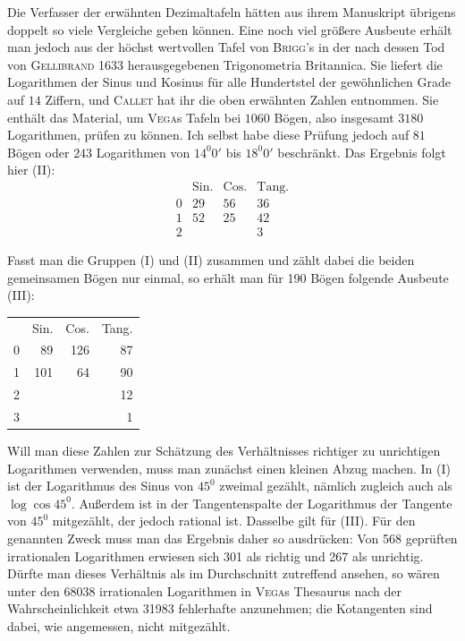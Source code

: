 Die Verfasser der erwähnten Dezimaltafeln hätten aus ihrem Manuskript übrigens doppelt so viele Vergleiche geben können. Eine noch viel größere Ausbeute erhält man jedoch aus der höchst wertvollen Tafel von \textsc{Brigg}'s in der nach dessen Tod von \textsc{Gellibrand} 1633 herausgegebenen Trigonometria Britannica. Sie liefert die Logarithmen der Sinus und Kosinus für alle Hundertstel der gewöhnlichen Grade auf \(14\) Ziffern, und \textsc{Callet} hat ihr die oben erwähnten Zahlen entnommen. Sie enthält das Material, um \textsc{Vega}s Tafeln bei \(1060\) Bögen, also insgesamt \(3180\) Logarithmen, prüfen zu können. Ich selbst habe diese Prüfung jedoch auf \(81\) Bögen oder \(243\) Logarithmen von \(14^{0}0'\) bis \(18^{0}0'\) beschränkt. Das Ergebnis folgt hier (II):
\[
\begin{array}{rccc}
 & \mathrm{Sin.} & \mathrm{Cos.} & \mathrm{Tang.} \\
0 & 29 & 56 & 36 \\
1 & 52 & 25 & 42 \\
2 &    &    & 3
\end{array}
\]
\par
{}
Fasst man die Gruppen (I) und (II) zusammen und zählt dabei die beiden gemeinsamen Bögen nur einmal, so erhält man für 190 Bögen folgende Ausbeute (III):
\begin{center}
\begin{tabular}{rrrr}
 & Sin. & Cos. & Tang. \\
0 & 89 & 126 & 87 \\
1 & 101 & 64 & 90 \\
2 & & & 12 \\
3 & & & 1
\end{tabular}
\end{center}
Will man diese Zahlen zur Schätzung des Verhältnisses richtiger zu unrichtigen Logarithmen verwenden, muss man zunächst einen kleinen Abzug machen. In (I) ist der Logarithmus des Sinus von $45^{0}$ zweimal gezählt, nämlich zugleich auch als $\log\cos45^{0}$. Außerdem ist in der Tangentenspalte der Logarithmus der Tangente von $45^{0}$ mitgezählt, der jedoch rational ist. Dasselbe gilt für (III). Für den genannten Zweck muss man das Ergebnis daher so ausdrücken: Von 568 geprüften irrationalen Logarithmen erwiesen sich 301 als richtig und 267 als unrichtig. Dürfte man dieses Verhältnis als im Durchschnitt zutreffend ansehen, so wären unter den 68038 irrationalen Logarithmen in \textsc{Vega}s Thesaurus nach der Wahrscheinlichkeit etwa 31983 fehlerhafte anzunehmen; die Kotangenten sind dabei, wie angemessen, nicht mitgezählt.

